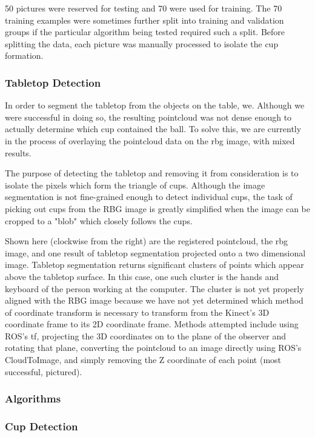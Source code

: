 \documentclass[letterpaper, 10 pt, conference]{ieeeconf}  %
\begin{document}
50 pictures were reserved for testing and 70 were used for training.  The 70 training examples were sometimes further split into training and validation groups if the particular algorithm being tested required such a split.  Before splitting the data, each picture was manually processed to isolate the cup formation.

\subsubsection{Tabletop Detection}


In order to segment the tabletop from the objects on the table, we.  Although we were successful in doing so, the resulting pointcloud was not dense enough to actually determine which cup contained the ball.  To solve this, we are currently in the process of overlaying the pointcloud data on the rbg image, with mixed results.

The purpose of detecting the tabletop and removing it from consideration is to isolate the pixels which form the triangle of cups.  Although the image segmentation is not fine-grained enough to detect individual cups, the task of picking out cups from the RBG image is greatly simplified when the image can be cropped to a "blob" which closely follows the cups.


Shown here (clockwise from the right) are the registered pointcloud, the rbg image, and one result of tabletop segmentation projected onto a two dimensional image.  Tabletop segmentation returns significant clusters of points which appear above the tabletop surface.  In this case, one such cluster is the hands and keyboard of the person working at the computer.  The cluster is not yet properly aligned with the RBG image because we have not yet determined which method of coordinate transform is necessary to transform from the Kinect's 3D coordinate frame to its 2D coordinate frame.  Methods attempted include using ROS's tf, projecting the 3D coordinates on to the plane of the observer and rotating that plane, converting the pointcloud to an image directly using ROS's CloudToImage, and simply removing the Z coordinate of each point (most successful, pictured).


\subsubsection{Algorithms}

\subsubsection{Cup Detection}
\end{document}
